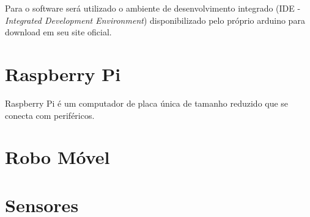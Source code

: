 Para o software será utilizado o ambiente de desenvolvimento integrado (IDE - \textit{Integrated Development Environment}) disponibilizado pelo próprio arduino para download em seu site oficial.


\section{Raspberry Pi}
\label{sec:raspberrypi}

Raspberry Pi é um computador de placa única de tamanho reduzido que se conecta com periféricos.


\section{Robo Móvel}
\label{sec:robomovel}


\section{Sensores}
\label{sec:sensores}










